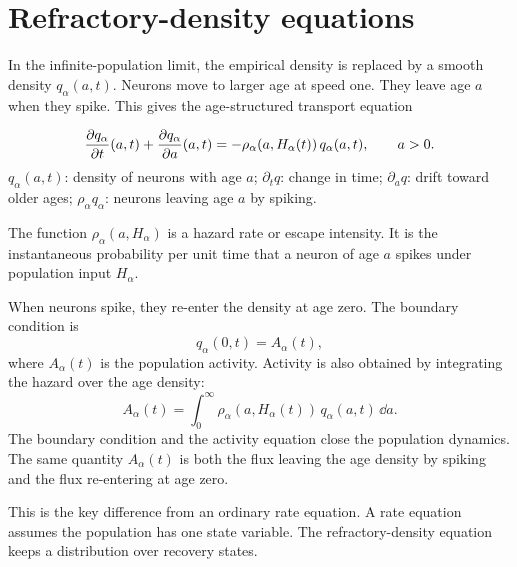 \section{Refractory-density equations}
\label{sec:refractory-density-equations}

In the infinite-population limit, the empirical density is replaced by a smooth density $q_\alpha(a,t)$. Neurons move to larger age at speed one. They leave age $a$ when they spike. This gives the age-structured transport equation
%
\begin{keyequation}
\begin{equation}
  \frac{\partial q_\alpha}{\partial t}(a,t)
  +
  \frac{\partial q_\alpha}{\partial a}(a,t)
  =
  -\rho_\alpha(a,H_\alpha(t))\,q_\alpha(a,t),
  \qquad a>0 .
  \label{eq:refractory-density-pde}
\end{equation}
\tcblower
$q_\alpha(a,t)$: density of neurons with age $a$; \quad
$\partial_t q$: change in time; \quad
$\partial_a q$: drift toward older ages; \quad
$\rho_\alpha q_\alpha$: neurons leaving age $a$ by spiking.
\end{keyequation}

\noindent The function $\rho_\alpha(a,H_\alpha)$ is a hazard rate or escape intensity. It is the instantaneous probability per unit time that a neuron of age $a$ spikes under population input $H_\alpha$.

When neurons spike, they re-enter the density at age zero. The boundary condition is
%
\begin{equation}
  q_\alpha(0,t)=A_\alpha(t),
  \label{eq:age-density-boundary}
\end{equation}
%
where $A_\alpha(t)$ is the population activity. Activity is also obtained by integrating the hazard over the age density:
%
\begin{equation}
  A_\alpha(t)
  =
  \int_0^\infty
  \rho_\alpha(a,H_\alpha(t))\,q_\alpha(a,t)\,\dd a .
  \label{eq:activity-from-age-density}
\end{equation}
%
The boundary condition and the activity equation close the population dynamics. The same quantity $A_\alpha(t)$ is both the flux leaving the age density by spiking and the flux re-entering at age zero.

This is the key difference from an ordinary rate equation. A rate equation assumes the population has one state variable. The refractory-density equation keeps a distribution over recovery states.

